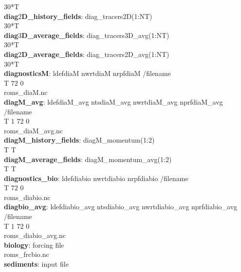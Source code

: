                                   $30$*T               \\
\textbf{diag$2$D\_history\_fields}: diag\_tracers$2$D(1:NT) \\
                                  $30$*T               \\
\textbf{diag$3$D\_average\_fields}: diag\_tracers$3$D\_avg(1:NT) \\
                                  $30$*T                   \\
\textbf{diag$2$D\_average\_fields}: diag\_tracers$2$D\_avg(1:NT) \\
                                  $30$*T                   \\
\textbf{diagnosticsM}:   ldefdiaM   nwrtdiaM    nrpfdiaM /filename \\
                   T          $72$          $0$ \\
                                 roms\_diaM.nc \\
\textbf{diagM\_avg}: ldefdiaM\_avg  ntsdiaM\_avg  nwrtdiaM\_avg  nprfdiaM\_avg /filename \\
               T          $1$           $72$            $0$ \\
                                 roms\_diaM\_avg.nc \\
\textbf{diagM\_history\_fields}: diagM\_momentum(1:2) \\
                                  T T               \\
\textbf{diagM\_average\_fields}: diagM\_momentum\_avg(1:2) \\
                                  T T               \\
\textbf{diagnostics\_bio}:   ldefdiabio   nwrtdiabio    nrpfdiabio /filename \\
                        T          $72$             $0$ \\
                                 roms\_diabio.nc \\
\textbf{diagbio\_avg}: ldefdiabio\_avg  ntsdiabio\_avg  nwrtdiabio\_avg  nprfdiabio\_avg
/filename \\
                  T              $1$             $72$              $0$ \\
                                 roms\_diabio\_avg.nc \\
\textbf{biology}:   forcing file \\
           roms\_frcbio.nc \\
\textbf{sediments}: input file \\
